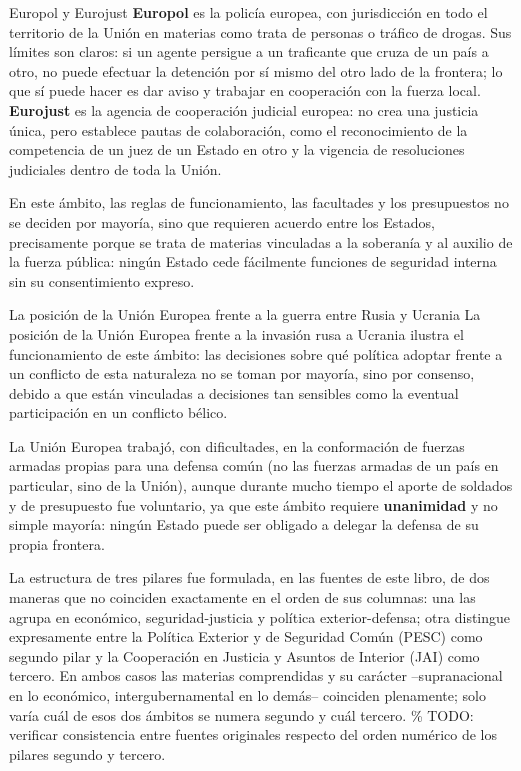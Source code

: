 \documentclass[12pt,oneside]{book}
\begin{document}
\begin{ejemplo}{Europol y Eurojust}
\textbf{Europol} es la policía europea, con jurisdicción en todo el territorio de la Unión en materias como trata de personas o tráfico de drogas. Sus límites son claros: si un agente persigue a un traficante que cruza de un país a otro, no puede efectuar la detención por sí mismo del otro lado de la frontera; lo que sí puede hacer es dar aviso y trabajar en cooperación con la fuerza local. \textbf{Eurojust} es la agencia de cooperación judicial europea: no crea una justicia única, pero establece pautas de colaboración, como el reconocimiento de la competencia de un juez de un Estado en otro y la vigencia de resoluciones judiciales dentro de toda la Unión.
\end{ejemplo}

En este ámbito, las reglas de funcionamiento, las facultades y los presupuestos no se deciden por mayoría, sino que requieren acuerdo entre los Estados, precisamente porque se trata de materias vinculadas a la soberanía y al auxilio de la fuerza pública: ningún Estado cede fácilmente funciones de seguridad interna sin su consentimiento expreso.

\begin{ejemplo}{La posición de la Unión Europea frente a la guerra entre Rusia y Ucrania}
La posición de la Unión Europea frente a la invasión rusa a Ucrania ilustra el funcionamiento de este ámbito: las decisiones sobre qué política adoptar frente a un conflicto de esta naturaleza no se toman por mayoría, sino por consenso, debido a que están vinculadas a decisiones tan sensibles como la eventual participación en un conflicto bélico.
\end{ejemplo}

La Unión Europea trabajó, con dificultades, en la conformación de fuerzas armadas propias para una defensa común (no las fuerzas armadas de un país en particular, sino de la Unión), aunque durante mucho tiempo el aporte de soldados y de presupuesto fue voluntario, ya que este ámbito requiere \textbf{unanimidad} y no simple mayoría: ningún Estado puede ser obligado a delegar la defensa de su propia frontera.

\begin{nota}
La estructura de tres pilares fue formulada, en las fuentes de este libro, de dos maneras que no coinciden exactamente en el orden de sus columnas: una las agrupa en económico, seguridad-justicia y política exterior-defensa; otra distingue expresamente entre la Política Exterior y de Seguridad Común (PESC) como segundo pilar y la Cooperación en Justicia y Asuntos de Interior (JAI) como tercero. En ambos casos las materias comprendidas y su carácter --supranacional en lo económico, intergubernamental en lo demás-- coinciden plenamente; solo varía cuál de esos dos ámbitos se numera segundo y cuál tercero. \% TODO: verificar consistencia entre fuentes originales respecto del orden numérico de los pilares segundo y tercero.
\end{nota}
\end{document}
